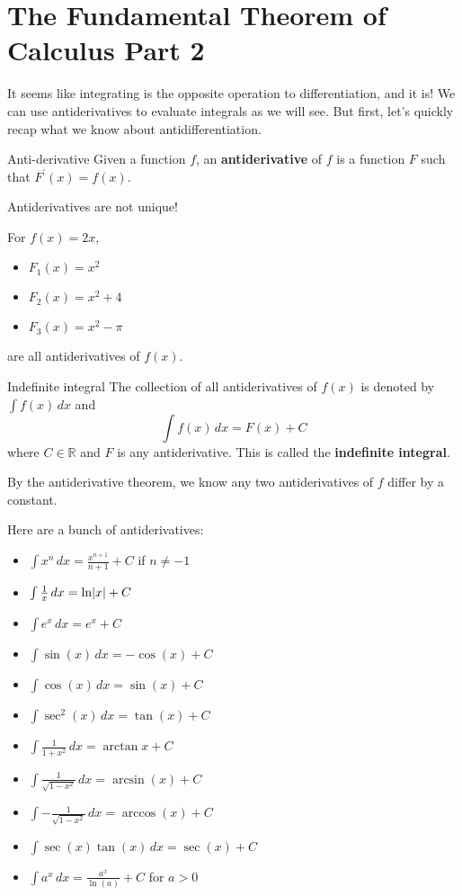 \section{The Fundamental Theorem of Calculus Part 2}
It seems like integrating is the opposite operation to
differentiation, and it is! We can use antiderivatives
to evaluate integrals as we will see. But first, let's
quickly recap what we know about antidifferentiation.

\begin{Definition}{Anti-derivative}{}
    Given a function $ f $, an \textbf{antiderivative} of
    $ f $ is a function $ F $ such that $ F^\prime(x)=f(x) $.
\end{Definition}

\begin{Remark}{}{}
    Antiderivatives are not unique!
\end{Remark}

\begin{Example}{}{}
    For $ f(x)=2x $,
    \begin{itemize}
        \item $ F_1(x)=x^2 $
        \item $ F_2(x)=x^2+4 $
        \item $ F_3(x)=x^2-\pi $
    \end{itemize}
    are all antiderivatives of $ f(x) $.
\end{Example}

\begin{Definition}{Indefinite integral}{}
    The collection of all antiderivatives of $ f(x) $ is denoted
    by $ \int f(x)\, d{x} $ and
    \[ \int f(x)\, d{x} =F(x)+C \]
    where $ C\in\mathbb{R} $ and $ F $ is any antiderivative.
    This is called the \textbf{indefinite integral}.
\end{Definition}

\begin{Remark}{}{}
    By the antiderivative theorem, we know any two antiderivatives
    of $ f $ differ by a constant.
\end{Remark}

Here are a bunch of antiderivatives:
\begin{itemize}
    \item $ \int x^n\, d{x}=\frac{x^{n+1}}{n+1}+C $ if $ n\neq -1 $
    \item $ \int \frac{1}{x}\, d{x}=\ln\lvert x\rvert+C $
    \item $ \int e^x\,d{x}=e^x+C $
    \item $ \int \sin(x)\,d{x}=-\cos(x)+C $
    \item $ \int \cos(x)\,d{x}=\sin(x)+C $
    \item $ \int \sec^2(x)\,d{x}=\tan(x)+C $
    \item $ \int \frac{1}{1+x^2}\,d{x}=\arctan{x}+C $
    \item $ \int \frac{1}{\sqrt{1-x^2}}\,d{x}=\arcsin(x)+C $
    \item $ \int -\frac{1}{\sqrt{1-x^2}}\, d{x}=\arccos(x)+C $
    \item $ \int \sec(x)\tan(x)\,d{x}=\sec(x)+C $
    \item $ \int a^x\,d{x}=\frac{a^x}{\ln(a)}+C $ for $ a>0 $
\end{itemize}

